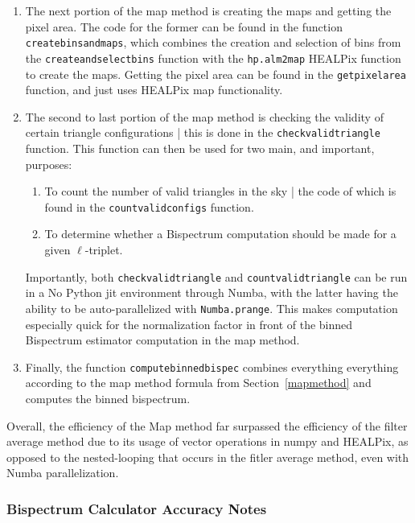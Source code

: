 \documentclass[11pt]{article}
\renewcommand{\_}[1]{\underline{ #1 }}
\newcommand{\us}{\textunderscore}
\begin{document}
{\begin{enumerate}
    \item The next portion of the map method is creating the maps and getting the pixel area. The code for the former can be found in the function \texttt{create\us bins\us and\us maps}, which combines the creation and selection of bins from the \texttt{create\us and\us select\us bins} function with the \texttt{hp.alm2map} HEALPix function to create the maps. Getting the pixel area can be found in the \texttt{get\us pixel\us area} function, and just uses HEALPix map functionality.
    \item The second to last portion of the map method is checking the validity of certain triangle configurations | this is done in the \texttt{check\us valid\us triangle} function. This function can then be used for two main, and important, purposes:
    \begin{enumerate}
        \item To count the number of valid triangles in the sky | the code of which is found in the \texttt{count\us valid\us configs} function.
        \item To determine whether a Bispectrum computation should be made for a given $\ell$-triplet.
    \end{enumerate}
    Importantly, both \texttt{check\us valid\us triangle} and \texttt{count\us valid\us triangle} can be run in a No Python jit environment through Numba, with the latter having the ability to be auto-parallelized with \texttt{Numba.prange}. This makes computation especially quick for the normalization factor in front of the binned Bispectrum estimator computation in the map method.
    \item Finally, the function \texttt{compute\us binned\us bispec} combines everything everything according to the map method formula from Section~\ref{mapmethod} and computes the binned bispectrum.
\end{enumerate}

Overall, the efficiency of the Map method far surpassed the efficiency of the filter average method due to its usage of vector operations in numpy and HEALPix, as opposed to the nested-looping that occurs in the fitler average method, even with Numba parallelization.

\subsubsection{Bispectrum Calculator Accuracy Notes}\label{bispecaccnotes}

}
\end{document}
